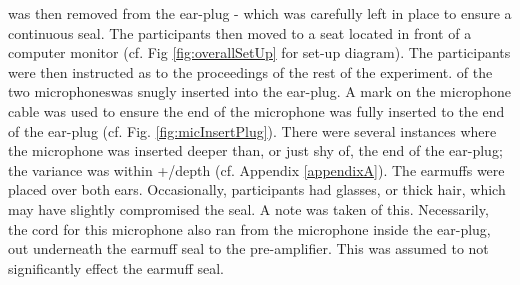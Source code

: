 \DIFdelend \DIFaddbegin {}\DIFaddend was then removed from the ear-plug - which was carefully left in place to ensure a continuous seal.  The participants then moved to a seat located in front of a computer monitor (cf. Fig \ref{fig:overallSetUp} for set-up diagram).  The participants were then instructed as to the proceedings of the rest of the experiment. \DIFdelbegin {}\DIFdelend \DIFaddbegin {}\DIFaddend of the two microphones\DIFdelbegin {}\DIFdelend \DIFaddbegin {}\DIFaddend was snugly inserted into the ear-plug.  A mark on the microphone cable was used to ensure the end of the microphone was fully inserted to the end of the ear-plug (cf. Fig. \ref{fig:micInsertPlug}).  
There were several instances where the microphone was inserted deeper than, or just shy of, the end of the ear-plug; the variance was within +/\DIFdelbegin \DIFdel{-2mm }\DIFdelend \DIFaddbegin \DIFadd{-2 mm }\DIFaddend depth (cf. Appendix \ref{appendixA}).  The earmuffs were placed over both ears.  Occasionally, participants had glasses, or thick hair, which may have slightly compromised the seal.  A note was taken of this. Necessarily, the cord for this microphone also ran from the microphone inside the ear-plug, out underneath the earmuff seal to the pre-amplifier.  This was assumed to not significantly effect the earmuff seal.




\DIFdelbegin %
{%
}

